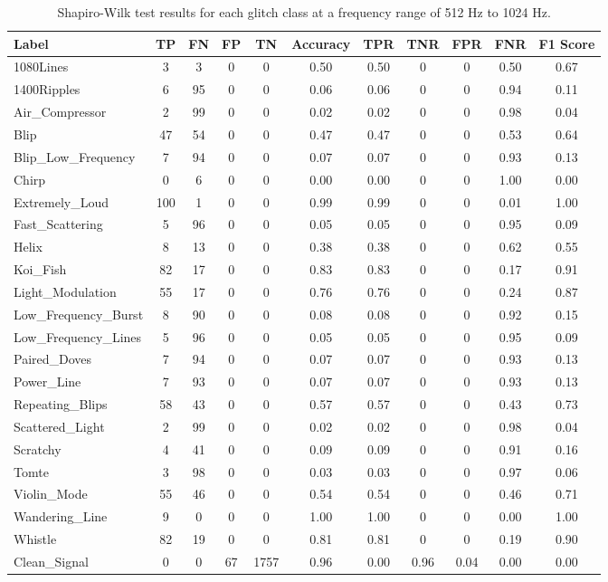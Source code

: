 \documentclass[12pt]{article}
\begin{document}
\begin{table}[H]
  \begin{tabular}{lcccccccccc}
  \toprule
  Label & TP & FN & FP & TN & Accuracy & TPR & TNR & FPR & FNR & F1 Score \\
  \midrule
  1080Lines & 3 & 3 & 0 & 0 & 0.50 & 0.50 & 0 & 0 & 0.50 & 0.67 \\
  1400Ripples & 6 & 95 & 0 & 0 & 0.06 & 0.06 & 0 & 0 & 0.94 & 0.11 \\
  Air\_Compressor & 2 & 99 & 0 & 0 & 0.02 & 0.02 & 0 & 0 & 0.98 & 0.04 \\
  Blip & 47 & 54 & 0 & 0 & 0.47 & 0.47 & 0 & 0 & 0.53 & 0.64 \\
  Blip\_Low\_Frequency & 7 & 94 & 0 & 0 & 0.07 & 0.07 & 0 & 0 & 0.93 & 0.13 \\
  Chirp & 0 & 6 & 0 & 0 & 0.00 & 0.00 & 0 & 0 & 1.00 & 0.00 \\
  Extremely\_Loud & 100 & 1 & 0 & 0 & 0.99 & 0.99 & 0 & 0 & 0.01 & 1.00 \\
  Fast\_Scattering & 5 & 96 & 0 & 0 & 0.05 & 0.05 & 0 & 0 & 0.95 & 0.09 \\
  Helix & 8 & 13 & 0 & 0 & 0.38 & 0.38 & 0 & 0 & 0.62 & 0.55 \\
  Koi\_Fish & 82 & 17 & 0 & 0 & 0.83 & 0.83 & 0 & 0 & 0.17 & 0.91 \\
  Light\_Modulation & 55 & 17 & 0 & 0 & 0.76 & 0.76 & 0 & 0 & 0.24 & 0.87 \\
  Low\_Frequency\_Burst & 8 & 90 & 0 & 0 & 0.08 & 0.08 & 0 & 0 & 0.92 & 0.15 \\
  Low\_Frequency\_Lines & 5 & 96 & 0 & 0 & 0.05 & 0.05 & 0 & 0 & 0.95 & 0.09 \\
  Paired\_Doves & 7 & 94 & 0 & 0 & 0.07 & 0.07 & 0 & 0 & 0.93 & 0.13 \\
  Power\_Line & 7 & 93 & 0 & 0 & 0.07 & 0.07 & 0 & 0 & 0.93 & 0.13 \\
  Repeating\_Blips & 58 & 43 & 0 & 0 & 0.57 & 0.57 & 0 & 0 & 0.43 & 0.73 \\
  Scattered\_Light & 2 & 99 & 0 & 0 & 0.02 & 0.02 & 0 & 0 & 0.98 & 0.04 \\
  Scratchy & 4 & 41 & 0 & 0 & 0.09 & 0.09 & 0 & 0 & 0.91 & 0.16 \\
  Tomte & 3 & 98 & 0 & 0 & 0.03 & 0.03 & 0 & 0 & 0.97 & 0.06 \\
  Violin\_Mode & 55 & 46 & 0 & 0 & 0.54 & 0.54 & 0 & 0 & 0.46 & 0.71 \\
  Wandering\_Line & 9 & 0 & 0 & 0 & 1.00 & 1.00 & 0 & 0 & 0.00 & 1.00 \\
  Whistle & 82 & 19 & 0 & 0 & 0.81 & 0.81 & 0 & 0 & 0.19 & 0.90 \\
  Clean\_Signal & 0 & 0 & 67 & 1757 & 0.96 & 0.00 & 0.96 & 0.04 & 0.00 & 0.00 \\
  \bottomrule
  \end{tabular}
  \caption{Shapiro-Wilk test results for each glitch class at a frequency range of 512 Hz to 1024 Hz.}
  \label{tab:shapiro_high_frequency_results}
\end{table}
\end{document}
